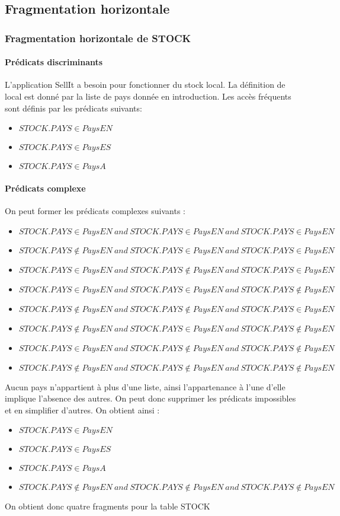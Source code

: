 \documentclass[10pt,a4paper,twoside]{article}
\begin{document}
\subsection{Fragmentation horizontale}
\subsubsection{Fragmentation horizontale de STOCK}
\paragraph{Prédicats discriminants}
L'application SellIt a besoin pour fonctionner du stock local. La définition de local est donné par la liste de pays donnée en introduction. Les accès fréquents sont définis par les prédicats suivants:
\begin{itemize}
\item $STOCK.PAYS \in PaysEN$
\item $STOCK.PAYS \in PaysES$
\item $STOCK.PAYS \in PaysA$
\end{itemize}

\paragraph{Prédicats complexe}
On peut former les prédicats complexes suivants :
\begin{itemize}
\item $STOCK.PAYS \in PaysEN\ and\ STOCK.PAYS \in PaysEN\ and\ STOCK.PAYS \in PaysEN$
\item $STOCK.PAYS \not\in PaysEN\ and\ STOCK.PAYS \in PaysEN\ and\ STOCK.PAYS \in PaysEN$
\item $STOCK.PAYS \in PaysEN\ and\ STOCK.PAYS \not\in PaysEN\ and\ STOCK.PAYS \in PaysEN$
\item $STOCK.PAYS \in PaysEN\ and\ STOCK.PAYS \in PaysEN\ and\ STOCK.PAYS \not\in PaysEN$
\item $STOCK.PAYS \not\in PaysEN\ and\ STOCK.PAYS \not\in PaysEN\ and\ STOCK.PAYS \in PaysEN$
\item $STOCK.PAYS \not\in PaysEN\ and\ STOCK.PAYS \in PaysEN\ and\ STOCK.PAYS \not\in PaysEN$
\item $STOCK.PAYS \in PaysEN\ and\ STOCK.PAYS \not\in PaysEN\ and\ STOCK.PAYS \not\in PaysEN$
\item $STOCK.PAYS \not\in PaysEN\ and\ STOCK.PAYS \not\in PaysEN\ and\ STOCK.PAYS \not\in PaysEN$
\end{itemize}
Aucun pays n'appartient à plus d'une liste, ainsi l'appartenance à l'une d'elle implique l’absence des autres. On peut donc supprimer les prédicats impossibles et en simplifier d'autres. On obtient ainsi :
\begin{itemize}
\item $STOCK.PAYS \in PaysEN$
\item $STOCK.PAYS \in PaysES$
\item $STOCK.PAYS \in PaysA$
\item $STOCK.PAYS \not\in PaysEN\ and\ STOCK.PAYS \not\in PaysEN\ and\ STOCK.PAYS \not\in PaysEN$
\end{itemize}
On obtient donc quatre fragments pour la table STOCK
\end{document}
